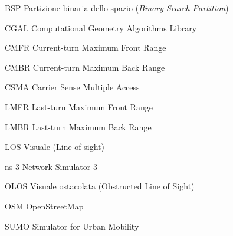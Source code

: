 \begin{abbreviations}

\item[BSP] Partizione binaria dello spazio (\textit{Binary Search Partition})
\item[CGAL] Computational Geometry Algorithms Library
\item[CMFR] Current-turn Maximum Front Range
\item[CMBR] Current-turn Maximum Back Range
\item[CSMA] Carrier Sense Multiple Access
\item[LMFR] Last-turn Maximum Front Range
\item[LMBR] Last-turn Maximum Back Range
\item[LOS] Visuale (Line of sight)
\item[ns-3] Network Simulator 3
\item[OLOS] Visuale ostacolata (Obstructed Line of Sight)
\item[OSM] OpenStreetMap
\item[SUMO] Simulator for Urban Mobility

\end{abbreviations}
